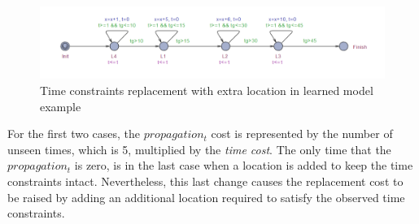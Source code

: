\begin{figure}[h]
	\centering
	\includegraphics[scale=0.5]{./pictures/learned_model_example_time_replacement_addition.png}
	\caption{Time constraints replacement with extra location in learned model example}
	\label{learned_model_example_time_replacement_addition}
\end{figure}
%
%
%
%
%
%
%
For the first two cases, the $propagation_t$ cost is represented by the number of unseen times, which is 5, multiplied by the \textit{time cost}. The only time that the $propagation_t$ is zero, is in the last case when a location is added to keep the time constraints intact. Nevertheless, this last change causes the replacement cost to be raised by adding an additional location required to satisfy the observed time constraints. 

